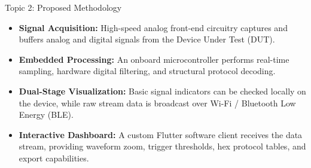 \documentclass{beamer}
\begin{document}
\begin{frame}{Topic 2: Proposed Methodology}
\begin{itemize}
  \item \textbf{Signal Acquisition:} High-speed analog front-end circuitry captures and buffers analog and digital signals from the Device Under Test (DUT).
  \vspace{0.25cm}
  \item \textbf{Embedded Processing:} An onboard microcontroller performs real-time sampling, hardware digital filtering, and structural protocol decoding.
  \vspace{0.25cm}
  \item \textbf{Dual-Stage Visualization:} Basic signal indicators can be checked locally on the device, while raw stream data is broadcast over Wi-Fi / Bluetooth Low Energy (BLE).
  \vspace{0.25cm}
  \item \textbf{Interactive Dashboard:} A custom Flutter software client receives the data stream, providing waveform zoom, trigger thresholds, hex protocol tables, and export capabilities.
\end{itemize}
\end{frame}
\end{document}
